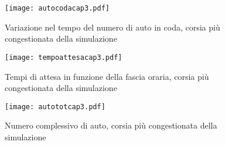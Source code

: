 \begin{figure}[H]
\centering
  \texttt{[image: autocodacap3.pdf]}
  \caption{Variazione nel tempo del numero di auto in coda, corsia più congestionata della simulazione}
  \label{fig:}
\end{figure}
\begin{figure}[H]
\centering
  \texttt{[image: tempoattesacap3.pdf]}
  \caption{Tempi di attesa in funzione della fascia oraria, corsia più congestionata della simulazione}
  \label{fig:}
\end{figure}
\newpage

\begin{figure}[H]
\centering
  \texttt{[image: autototcap3.pdf]}
  \caption{Numero complessivo di auto, corsia più congestionata della simulazione}
  \label{fig:}
\end{figure}













